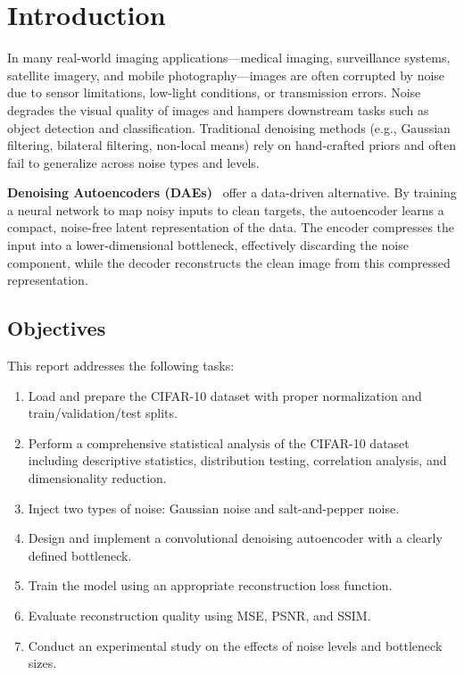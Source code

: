 \documentclass[runningheads]{llncs}
\begin{document}
\section{Introduction}
\label{sec:intro}

In many real-world imaging applications---medical imaging, surveillance systems, satellite imagery, and mobile photography---images are often corrupted by noise due to sensor limitations, low-light conditions, or transmission errors. Noise degrades the visual quality of images and hampers downstream tasks such as object detection and classification. Traditional denoising methods (e.g., Gaussian filtering, bilateral filtering, non-local means) rely on hand-crafted priors and often fail to generalize across noise types and levels.

\textbf{Denoising Autoencoders (DAEs)}~\cite{vincent2008extracting} offer a data-driven alternative. By training a neural network to map noisy inputs to clean targets, the autoencoder learns a compact, noise-free latent representation of the data. The encoder compresses the input into a lower-dimensional bottleneck, effectively discarding the noise component, while the decoder reconstructs the clean image from this compressed representation.

\subsection{Objectives}
This report addresses the following tasks:
\begin{enumerate}[nosep]
    \item Load and prepare the CIFAR-10 dataset with proper normalization and train/validation/test splits.
    \item Perform a comprehensive statistical analysis of the CIFAR-10 dataset including descriptive statistics, distribution testing, correlation analysis, and dimensionality reduction.
    \item Inject two types of noise: Gaussian noise and salt-and-pepper noise.
    \item Design and implement a convolutional denoising autoencoder with a clearly defined bottleneck.
    \item Train the model using an appropriate reconstruction loss function.
    \item Evaluate reconstruction quality using MSE, PSNR, and SSIM.
    \item Conduct an experimental study on the effects of noise levels and bottleneck sizes.
\end{enumerate}
\end{document}
